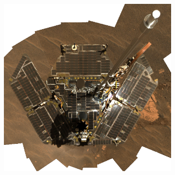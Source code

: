 \begin{figure}[h]
\captionsetup[subfigure]{justification=centering}
\centering
    \setlength{\subfigureWidth}{0.50\textwidth}
    \setlength{\graphicsHeight}{60mm}
    \hypersetup{hidelinks=true}%
    \begin{subfigure}[t]{\subfigureWidth}
        \centering
            \includegraphics[height=\graphicsHeight]{sections/mars-solar-energy/photovoltaic-energy/images/mer-solar-arrays.png}
            \label{fig:image:mer-solar-arrays}
    \end{subfigure}\hfill
    \begin{subfigure}[t]{\subfigureWidth}
        \centering

\end{subfigure}
\end{figure}
